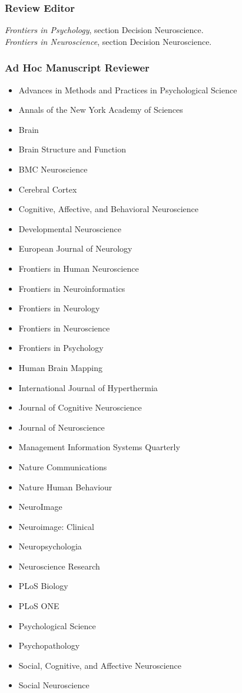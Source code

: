 \documentclass[11pt, letterpaper]{article}
\newcommand{\years}[1]{\marginnote{\scriptsize #1}}
\begin{document}
\subsubsection*{Review Editor}
\years{2015-2017} \textit{Frontiers in Psychology}, section Decision Neuroscience. \\
\years{2015-2017} \textit{Frontiers in Neuroscience}, section Decision Neuroscience.

\subsubsection*{Ad Hoc Manuscript Reviewer}
\begin{multicols}{2}
\begin{itemize}[noitemsep]
\itshape
\item Advances in Methods and Practices in Psychological Science
\item Annals of the New York Academy of Sciences
\item Brain
\item Brain Structure and Function
\item BMC Neuroscience 
\item Cerebral Cortex 
\item Cognitive, Affective, and Behavioral Neuroscience 
\item Developmental Neuroscience 
\item European Journal of Neurology
\item Frontiers in Human Neuroscience 
\item Frontiers in Neuroinformatics 
\item Frontiers in Neurology 
\item Frontiers in Neuroscience 
\item Frontiers in Psychology 
\item Human Brain Mapping 
\item International Journal of Hyperthermia 
\item Journal of Cognitive Neuroscience 
\item Journal of Neuroscience 
\item Management Information Systems Quarterly 
\item Nature Communications 
\item Nature Human Behaviour 
\item NeuroImage 
\item Neuroimage: Clinical 
\item Neuropsychologia 
\item Neuroscience Research 
\item PLoS Biology 
\item PLoS ONE 
\item Psychological Science 
\item Psychopathology 
\item Social, Cognitive, and Affective Neuroscience 
\item Social Neuroscience
\end{itemize}
\end{multicols}
\end{document}
